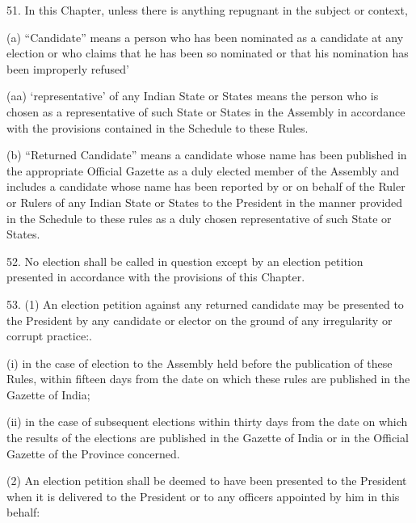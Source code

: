 51. In this Chapter, unless there is anything repugnant in the subject or context,\textemdash{}



(a) \textquotedblleft{}Candidate\textquotedblright{} means a person who has been nominated as a candidate at any election or who claims that he has been so nominated or that his nomination has been improperly refused\textquoteright{}



(aa) \textquoteleft{}representative\textquoteright{} of any Indian State or States means the person who is chosen as a representative of such State or States in the Assembly in accordance with the provisions contained in the Schedule to these Rules.



(b) \textquotedblleft{}Returned Candidate\textquotedblright{} means a candidate whose name has been published in the appropriate Official Gazette as a duly elected member of the Assembly and includes a candidate whose name has been reported by or on behalf of the Ruler or Rulers of any Indian State or States to the President in the manner provided in the Schedule to these rules as a duly chosen representative of such State or States.



52. No election shall be called in question except by an election petition presented in accordance with the provisions of this Chapter.



53. (1) An election petition against any returned candidate may be presented to the President by any candidate or elector on the ground of any irregularity or corrupt practice:.



(i) in the case of election to the Assembly held before the publication of these Rules, within fifteen days from the date on which these rules are published in the Gazette of India;



(ii) in the case of subsequent elections within thirty days from the date on which the results of the elections are published in the Gazette of India or in the Official Gazette of the Province concerned.



(2) An election petition shall be deemed to have been presented to the President when it is delivered to the President or to any officers appointed by him in this behalf:



